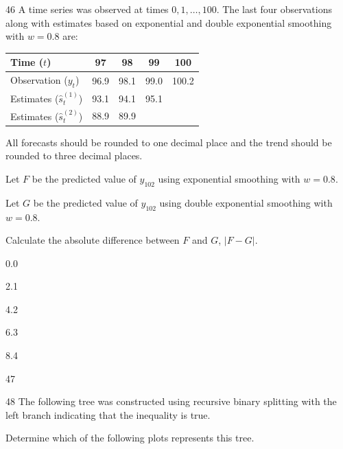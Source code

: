 \begin{question}{46}
A time series was observed at times $0, 1, \ldots, 100$. The last four observations along with estimates based on exponential and double exponential smoothing with $w = 0.8$ are:

\begin{center}
\begin{tabular}{|l|c|c|c|c|}
\hline
Time ($t$) & 97 & 98 & 99 & 100 \\ \hline
Observation ($y_t$) & 96.9 & 98.1 & 99.0 & 100.2 \\ \hline
Estimates ($\hat{s}_t^{(1)}$) & 93.1 & 94.1 & 95.1 & \\ \hline
Estimates ($\hat{s}_t^{(2)}$) & 88.9 & 89.9 & & \\ \hline
\end{tabular}
\end{center}

All forecasts should be rounded to one decimal place and the trend should be rounded to three decimal places.

Let $F$ be the predicted value of $y_{102}$ using exponential smoothing with $w = 0.8$.

Let $G$ be the predicted value of $y_{102}$ using double exponential smoothing with $w = 0.8$.

Calculate the absolute difference between $F$ and $G$, $|F - G|$.

\begin{choices}
\item 0.0
\item 2.1
\item 4.2
\item 6.3
\item 8.4
\end{choices}
\end{question}

\begin{question}{47}
\deleted
\end{question}

\begin{question}{48}
The following tree was constructed using recursive binary splitting with the left branch indicating that the inequality is true.


Determine which of the following plots represents this tree.

\begin{choices}
\item {}
\item {}
\item {}
\item {}
\item {}
\end{choices}
\end{question}

